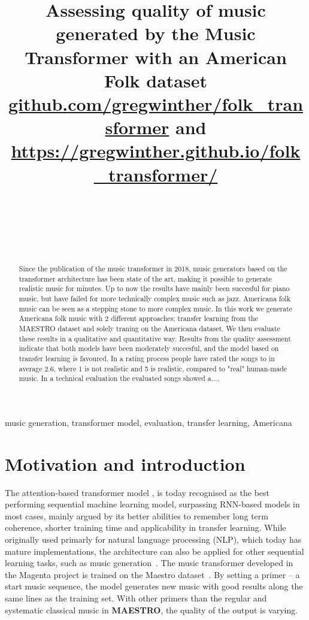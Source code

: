 \documentclass{IEEEtran}
\title{Assessing quality of music generated by the Music Transformer with an American Folk dataset \\
    \normalsize{\url{github.com/gregwinther/folk_transformer} and \url{https://gregwinther.github.io/folk_transformer/}}}
\author{\IEEEauthorblockN{Sebastian G. Winther-Larsen} \\
\IEEEauthorblockA{\textit{Center for Computing in Science Education,
    Department of Physics, University of Oslo} \\
}
\and
\IEEEauthorblockN{Tom F. Hansen} \\
\IEEEauthorblockA{\textit{Institute of Informatics, University of Oslo} \\
}
\and
\IEEEauthorblockN{Bjørn Iversen} \\
\IEEEauthorblockA{\textit{Institute of Informatics, University of Oslo} \\
}
}
\begin{document}
    \maketitle

    \begin{abstract}
        Since the publication of the music transformer in 2018, music generators based on
        the transformer architecture has been state of the art, making it possible to generate
        realistic music for minutes. Up to now the results have mainly been succesful for piano music, but
        have failed for more technically complex music such as jazz. Americana folk music can be seen as
        a stepping stone to more complex music. In this work we generate Americana folk music with 2 different approaches; transfer learning from the MAESTRO dataset and solely traning on the Americana dataset. We then evaluate these results in a qualitative and quantitative way. Results from the 
        quality assessment indicate that both models have been moderately succesful, and the model based on transfer learning is favoured. In a rating process people have rated the songs to in average 2.6,
         where 1 is not realistic and 5 is realistic, compared to "real" human-made music. In a technical 
         evaluation the evaluated songs showed a....
        \end{abstract}
        
        \begin{IEEEkeywords}
        music generation, transformer model, evaluation, transfer learning, Americana
        \end{IEEEkeywords}

    \section{Motivation and introduction}

        The attention-based transformer model \cite{vaswani2017attention},
        is today recognised as the best performing sequential machine learning model,
        surpassing RNN-based models in most cases, mainly argued by its better abilities
        to remember long term coherence, shorter training time and applicability in transfer
        learning. While originally used primarly for
        natural language processing (NLP), which today has mature implementations,
        the architecture can also be applied for other sequential learning tasks,
        such as music generation~\cite{huang2018music}.
        The music transformer developed in the Magenta project is trained on the Maestro
        dataset~\cite{maestrodataset}.
        By setting a primer – a start music sequence, the model generates new music with good
        results along the same lines as the training set. With other primers than the regular and
        systematic classical music in \textbf{MAESTRO}, the quality of the output is varying.
\end{document}
